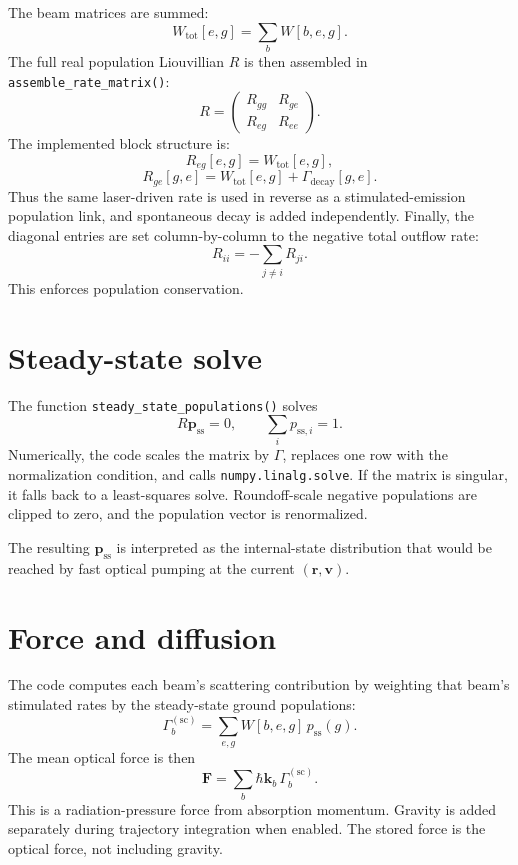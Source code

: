 \documentclass[11pt]{article}
\begin{document}
The beam matrices are summed:
\[
    W_{\mathrm{tot}}[e,g] = \sum_b W[b,e,g].
\]
The full real population Liouvillian \(R\) is then assembled in
\texttt{assemble\_rate\_matrix()}:
\[
    R =
    \begin{pmatrix}
        R_{gg} & R_{ge} \\
        R_{eg} & R_{ee}
    \end{pmatrix}.
\]
The implemented block structure is:
\[
    R_{eg}[e,g] = W_{\mathrm{tot}}[e,g],
\]
\[
    R_{ge}[g,e] = W_{\mathrm{tot}}[e,g] + \Gamma_{\mathrm{decay}}[g,e].
\]
Thus the same laser-driven rate is used in reverse as a stimulated-emission
population link, and spontaneous decay is added independently.  Finally, the
diagonal entries are set column-by-column to the negative total outflow rate:
\[
    R_{ii} = -\sum_{j\ne i} R_{ji}.
\]
This enforces population conservation.

\section{Steady-state solve}

The function \texttt{steady\_state\_populations()} solves
\[
    R\mathbf p_{\mathrm{ss}}=0,
    \qquad
    \sum_i p_{\mathrm{ss},i}=1.
\]
Numerically, the code scales the matrix by \(\Gamma\), replaces one row with the
normalization condition, and calls \texttt{numpy.linalg.solve}.  If the matrix is
singular, it falls back to a least-squares solve.  Roundoff-scale negative
populations are clipped to zero, and the population vector is renormalized.

The resulting \(\mathbf p_{\mathrm{ss}}\) is interpreted as the internal-state
distribution that would be reached by fast optical pumping at the current
\((\mathbf r,\mathbf v)\).

\section{Force and diffusion}

The code computes each beam's scattering contribution by weighting that beam's
stimulated rates by the steady-state ground populations:
\[
    \Gamma_b^{(\mathrm{sc})}
    =
    \sum_{e,g}
    W[b,e,g]\,p_{\mathrm{ss}}(g).
\]
The mean optical force is then
\[
    \mathbf F
    =
    \sum_b
    \hbar \mathbf k_b\,\Gamma_b^{(\mathrm{sc})}.
\]
This is a radiation-pressure force from absorption momentum.  Gravity is added
separately during trajectory integration when enabled.  The stored force is the
optical force, not including gravity.
\end{document}
